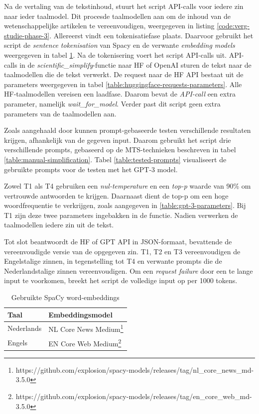 Na de vertaling van de tekstinhoud, stuurt het script API-calls voor iedere zin naar ieder taalmodel. Dit procesde taalmodellen aan om de inhoud van de wetenschappelijke artikelen te vereenvoudigen, weergegeven in listing \ref{code:verg-studie-phase-3}. Allereerst vindt een tokenisatiefase plaats. Daarvoor gebruikt het script de \textit{sentence tokenisation} van Spacy en de verwante \textit{embedding models} weergegeven in tabel \ref{table:wordembeddings-spacy}. Na de tokenisering voert het script API-calls uit. API-calls in de \textit{scientific\_simplify}-functie naar HF of OpenAI sturen de tekst naar de taalmodellen die de tekst verwerkt. De request naar de HF API bestaat uit de parameters weergegeven in tabel \ref{table:huggingface-requests-parameters}. Alle HF-taalmodellen vereisen een laadfase. Daarom bevat de \textit{API-call} een extra parameter, namelijk \textit{wait\_for\_model}. Verder past dit script geen extra parameters van de taalmodellen aan. 

\medspace

Zoals aangehaald door \textcite{Gooding2022} kunnen prompt-gebaseerde testen verschillende resultaten krijgen, afhankelijk van de gegeven input. Daarom gebruikt het script drie verschillende prompts, gebaseerd op de MTS-technieken beschreven in tabel \ref{table:manual-simplification}. Tabel \ref{table:tested-prompts} visualiseert de gebruikte prompts voor de testen met het GPT-3 model. 

\medspace

Zowel T1 als T4 gebruiken een \textit{nul-temperature} en een \textit{top-p} waarde van 90\% om vertrouwde antwoorden te krijgen. Daarnaast dient de top-p om een hoge woordfrequentie te verkrijgen, zoals aangegeven in \ref{table:gpt-3-parameters}. Bij T1 zijn deze twee parameters ingebakken in de functie. Nadien verwerken de taalmodellen iedere zin uit de tekst. 

\medspace

Tot slot beantwoordt de HF of GPT API in JSON-formaat, bevattende de vereenvoudigde versie van de opgegeven zin. T1, T2 en T3 vereenvoudigen de Engelstalige zinnen, in tegenstelling tot T4 en verwante prompts die de Nederlandstalige zinnen vereenvoudigen. Om een \textit{request failure} door een te lange input te voorkomen, breekt het script de volledige input op per 1000 tokens.


\begin{center}
	\begin{table}[H]
		\begin{tabular}{ | m{7cm} | m{7cm} | } 
			\hline
			\textbf{Taal} & \textbf{Embeddingsmodel} \\
			\hline
			Nederlands & NL Core News Medium\footnote{https://github.com/explosion/spacy-models/releases/tag/nl_core_news_md-3.5.0} \\ 
			\hline
			Engels & EN Core Web Medium\footnote{https://github.com/explosion/spacy-models/releases/tag/en_core_web_md-3.5.0} \\
			\hline
		\end{tabular}
		\caption{Gebruikte SpaCy word-embeddings}
		\label{table:wordembeddings-spacy}
	\end{table}
\end{center}

